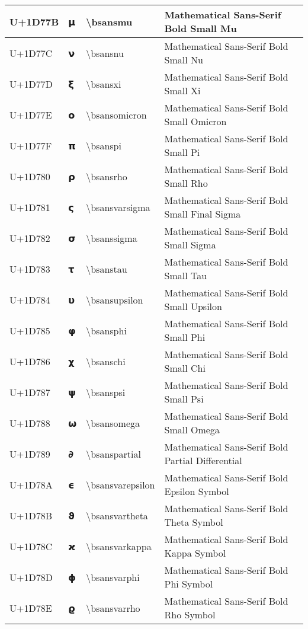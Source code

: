 \begin{table}[h]
\begin{tabulary}{\linewidth}{|L|L|L|L|}
\hline
U+1D77B & 𝝻 & {\textbackslash}bsansmu & Mathematical Sans-Serif Bold Small Mu \\
\hline
U+1D77C & 𝝼 & {\textbackslash}bsansnu & Mathematical Sans-Serif Bold Small Nu \\
\hline
U+1D77D & 𝝽 & {\textbackslash}bsansxi & Mathematical Sans-Serif Bold Small Xi \\
\hline
U+1D77E & 𝝾 & {\textbackslash}bsansomicron & Mathematical Sans-Serif Bold Small Omicron \\
\hline
U+1D77F & 𝝿 & {\textbackslash}bsanspi & Mathematical Sans-Serif Bold Small Pi \\
\hline
U+1D780 & 𝞀 & {\textbackslash}bsansrho & Mathematical Sans-Serif Bold Small Rho \\
\hline
U+1D781 & 𝞁 & {\textbackslash}bsansvarsigma & Mathematical Sans-Serif Bold Small Final Sigma \\
\hline
U+1D782 & 𝞂 & {\textbackslash}bsanssigma & Mathematical Sans-Serif Bold Small Sigma \\
\hline
U+1D783 & 𝞃 & {\textbackslash}bsanstau & Mathematical Sans-Serif Bold Small Tau \\
\hline
U+1D784 & 𝞄 & {\textbackslash}bsansupsilon & Mathematical Sans-Serif Bold Small Upsilon \\
\hline
U+1D785 & 𝞅 & {\textbackslash}bsansphi & Mathematical Sans-Serif Bold Small Phi \\
\hline
U+1D786 & 𝞆 & {\textbackslash}bsanschi & Mathematical Sans-Serif Bold Small Chi \\
\hline
U+1D787 & 𝞇 & {\textbackslash}bsanspsi & Mathematical Sans-Serif Bold Small Psi \\
\hline
U+1D788 & 𝞈 & {\textbackslash}bsansomega & Mathematical Sans-Serif Bold Small Omega \\
\hline
U+1D789 & 𝞉 & {\textbackslash}bsanspartial & Mathematical Sans-Serif Bold Partial Differential \\
\hline
U+1D78A & 𝞊 & {\textbackslash}bsansvarepsilon & Mathematical Sans-Serif Bold Epsilon Symbol \\
\hline
U+1D78B & 𝞋 & {\textbackslash}bsansvartheta & Mathematical Sans-Serif Bold Theta Symbol \\
\hline
U+1D78C & 𝞌 & {\textbackslash}bsansvarkappa & Mathematical Sans-Serif Bold Kappa Symbol \\
\hline
U+1D78D & 𝞍 & {\textbackslash}bsansvarphi & Mathematical Sans-Serif Bold Phi Symbol \\
\hline
U+1D78E & 𝞎 & {\textbackslash}bsansvarrho & Mathematical Sans-Serif Bold Rho Symbol \\

\end{tabulary}
\end{table}
